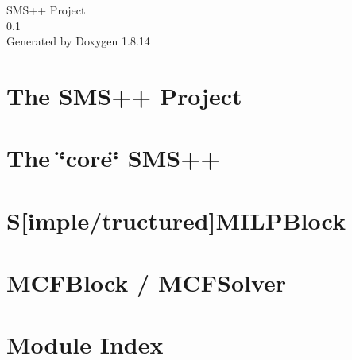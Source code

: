 \documentclass[twoside]{book}
\newcommand{\+}{\discretionary{\mbox{\scriptsize$\hookleftarrow$}}{}{}}
\newcommand{\clearemptydoublepage}{%
  \newpage{\pagestyle{empty}\cleardoublepage}%
}
\begin{document}
\hypersetup{pageanchor=false,
             bookmarksnumbered=true,
             pdfencoding=unicode
            }
\begin{titlepage}
\vspace*{7cm}
\begin{center}%
{\Large S\+M\+S++ Project \\[1ex]\large 0.\+1 }\\
\vspace*{1cm}
{\large Generated by Doxygen 1.8.14}\\
\end{center}
\end{titlepage}
\clearemptydoublepage
{}
\tableofcontents
\clearemptydoublepage
{}
\hypersetup{pageanchor=true}

\chapter{The S\+M\+S++ Project}
\label{index}\hypertarget{index}{}
\chapter{The \char`\"{}core\char`\"{} S\+M\+S++}
\label{md___users_frangio__codes__s_m_s_09_09__git_lab__s_m_s_09_09__r_e_a_d_m_e}

\chapter{S\mbox{[}imple/tructured\mbox{]}M\+I\+L\+P\+Block}
\label{md___users_frangio__codes__s_m_s_09_09__git_lab__s_m_i_l_p_block__r_e_a_d_m_e}

\chapter{M\+C\+F\+Block / M\+C\+F\+Solver}
\label{md___users_frangio__codes__s_m_s_09_09__git_lab__m_c_f_block__read_me}

\chapter{Module Index}

\end{document}
